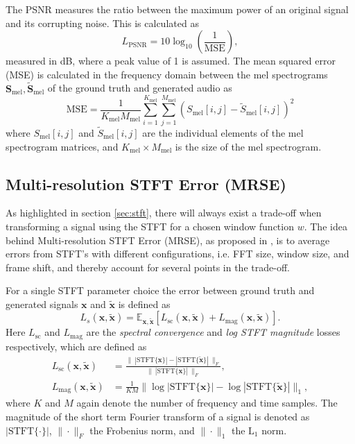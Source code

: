 \documentclass{report}
\begin{document}
The PSNR measures the ratio between the maximum power of an original signal and its corrupting noise. This is calculated as 
\begin{equation}
    L_{\text{PSNR}} = 10 \log_{10}\left(\frac{1}{\text{MSE}}\right),
\end{equation}
measured in dB, where a peak value of 1 is assumed. The mean squared error (MSE) is calculated in the frequency domain between the mel spectrograms $\bm{S}_{\text{mel}}, \tilde{\bm{S}}_{\text{mel}}$ of the ground truth and generated audio as
\begin{equation}
    \text{MSE} = \frac{1}{K_{\text{mel}}M_{\text{mel}}}\sum_{i=1}^{K_{\text{mel}}} \sum_{j=1}^{M_{\text{mel}}} \left( S_{\text{mel}}[i, j] - \tilde{S}_{\text{mel}}[i,j] \right)^2
\end{equation}
where $S_{\text{mel}}[i, j]$ and $\tilde{S}_{\text{mel}}[i,j]$ are the individual elements of the mel spectrogram matrices, and $K_{\text{mel}} \times M_{\text{mel}}$ is the size of the mel spectrogram.


\subsection{Multi-resolution STFT Error (MRSE)}
As highlighted in section \ref{sec:stft}, there will always exist a trade-off when transforming a signal using the STFT for a chosen window function $w$. The idea behind Multi-resolution STFT Error (MRSE), as proposed in \cite{yamamoto2020parallel}, is to average errors from STFT's with different configurations, i.e. FFT size, window size, and frame shift, and thereby account for several points in the trade-off.

For a single STFT parameter choice the error between ground truth and generated signals $\bm{x}$ and $\tilde{\bm{x}}$ is defined as
\begin{equation}
    L_s(\bm{x}, \tilde{\bm{x}}) = \mathbb{E}_{\bm{x}, \tilde{\bm{x}}} [L_{\text{sc}}(\bm{x}, \tilde{\bm{x}}) + L_{\text{mag}}(\bm{x}, \tilde{\bm{x}})].
\end{equation}
Here $L_{\text{sc}}$ and $L_{\text{mag}}$ are the \textit{spectral convergence} and \textit{log STFT magnitude} losses respectively, which are defined as
\begin{align}
    L_{\text{sc}}(\bm{x}, \tilde{\bm{x}}) &= \frac{\| \ |\text{STFT}\{\bm{x}\} | - | \text{STFT}\{\tilde{\bm{x}}\}| \ \|_F}{\| \ | \text{STFT}\{\bm{x}\} | \ \|_F}, \\
    L_{\text{mag}}(\bm{x}, \tilde{\bm{x}}) &= \frac{1}{KM} \| \log{| \text{STFT}\{\bm{x}\} | } - \log{| \text{STFT}\{\tilde{\bm{x}}\} |} \|_1,
\end{align}
where $K$ and $M$ again denote the number of frequency and time samples. The magnitude of the short term Fourier transform of a signal is denoted as $|\text{STFT}\{\cdot\}|$, $\|\cdot \|_F$ the Frobenius norm, and $\|\cdot\|_1$ the $\text{L}_1$ norm.
\end{document}
